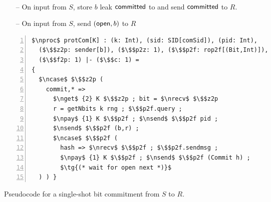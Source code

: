\begin{figure}
\centering
\begin{minipage}{0.5\textwidth}
\begin{bbox}[title={Functionality $\F_{\m{com}}(S, R)$}]
~
\begin{itemize}
\item[--] On input  from $S$, store $b$ leak $\mathsf{committed}$ to \A and send $\mathsf{committed}$ to $R$.
\item[--] On input  from $S$, send $(\mathsf{open}, b)$ to $R$
\end{itemize}
%
%
%
%
\end{bbox}
\end{minipage}
\hspace{3em}
\begin{minipage}{0.5\textwidth}
\begin{lstlisting}[basicstyle=\scriptsize\BeraMonottFamily, frame=single, mathescape, numbers=left, xleftmargin=2em, xrightmargin=2em]
$\nproc$ protCom[K] : (k: Int), (sid: SID[comSid]), (pid: Int),
  ($\$$z2p: sender[b]), ($\$$p2z: 1), ($\$$p2f: rop2f[(Bit,Int)]), 
  ($\$$f2p: 1) |- ($\$$c: 1) =
{
  $\ncase$ $\$$z2p (
    commit,* =>
      $\nget$ {2} K $\$$z2p ; bit = $\nrecv$ $\$$z2p 
      r = getNbits k rng ; $\$$p2f.query ;
      $\npay$ {1} K $\$$p2f ; $\nsend$ $\$$p2f pid ;
      $\nsend$ $\$$p2f (b,r) ;
      $\ncase$ $\$$p2f (
        hash => $\nrecv$ $\$$p2f ; $\$$p2f.sendmsg ;
        $\npay$ {1} K $\$$p2f ; $\nsend$ $\$$p2f (Commit h) ;
        $\tg{(* wait for open next *)}$
  ) ) }
\end{lstlisting}
\end{minipage}
\caption{Pseudocode for a single-shot bit commitment from $S$ to $R$.}
\label{fig:fcomideal}
\end{figure}
